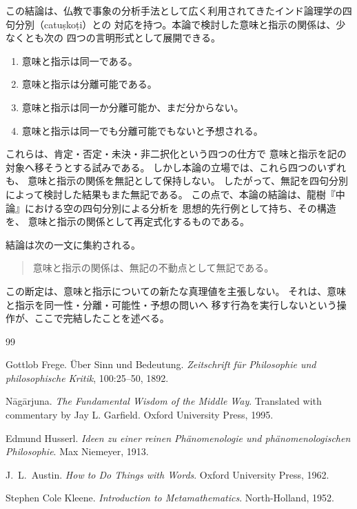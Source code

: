 \documentclass[11pt,a4paper,ja=standard,lualatex]{article}
\begin{document}
この結論は、仏教で事象の分析手法として広く利用されてきたインド論理学の四句分別（catu\d{s}ko\d{t}i）との
対応を持つ。本論で検討した意味と指示の関係は、少なくとも次の
四つの言明形式として展開できる。
\begin{enumerate}
\item 意味と指示は同一である。
\item 意味と指示は分離可能である。
\item 意味と指示は同一か分離可能か、まだ分からない。
\item 意味と指示は同一でも分離可能でもないと予想される。
\end{enumerate}
これらは、肯定・否定・未決・非二択化という四つの仕方で
意味と指示を記の対象へ移そうとする試みである。
しかし本論の立場では、これら四つのいずれも、
意味と指示の関係を無記として保持しない。
したがって、無記を四句分別によって検討した結果もまた無記である。
この点で、本論の結論は、龍樹『中論』における空の四句分別による分析を
思想的先行例として持ち、その構造を、
意味と指示の関係として再定式化するものである。

結論は次の一文に集約される。

\begin{quote}
意味と指示の関係は、無記の不動点として無記である。
\end{quote}

この断定は、意味と指示についての新たな真理値を主張しない。
それは、意味と指示を同一性・分離・可能性・予想の問いへ
移す行為を実行しないという操作が、ここで完結したことを述べる。

\begin{thebibliography}{99}

Gottlob Frege.
\newblock \"{U}ber Sinn und Bedeutung.
\newblock \emph{Zeitschrift f\"{u}r Philosophie und philosophische Kritik},
  100:25--50, 1892.

N\=ag\=arjuna.
\newblock \emph{The Fundamental Wisdom of the Middle Way}.
\newblock Translated with commentary by Jay L. Garfield.
\newblock Oxford University Press, 1995.

Edmund Husserl.
\newblock \emph{Ideen zu einer reinen Ph\"{a}nomenologie und
  ph\"{a}nomenologischen Philosophie}.
\newblock Max Niemeyer, 1913.

J.\ L.\ Austin.
\newblock \emph{How to Do Things with Words}.
\newblock Oxford University Press, 1962.

Stephen Cole Kleene.
\newblock \emph{Introduction to Metamathematics}.
\newblock North-Holland, 1952.

\end{thebibliography}
\end{document}
